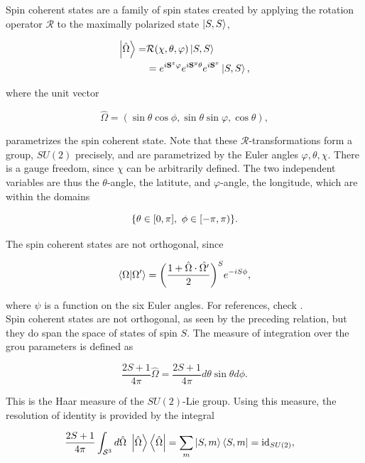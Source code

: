 \documentclass{homework}
\begin{document}
Spin coherent states are a family of spin states created by applying the rotation operator $\mathcal{R}$ to the maximally polarized state $\ket{S,S}$,

\begin{equation}
\begin{split}
    \ket{\hat{\Omega}} =& \mathcal{R}(\chi, \theta, \varphi) \ket{S,S} \\
    &= e^{i{\bf S}^z \varphi} e^{i {\bf S}^y \theta} e^{i {\bf S}^x} \ket{S,S},
\end{split}
\end{equation}

where the unit vector 

\begin{equation}
    \hat{\Omega} = (\sin \theta \cos \phi, \sin \theta \sin \varphi, \cos \theta),
\end{equation}

parametrizes the spin coherent state. Note that these $\mathcal{R}$-transformations form a group, $SU(2)$ precisely, and are parametrized by the Euler angles $\varphi, \theta, \chi$. There is a gauge freedom, since $\chi$ can be arbitrarily defined. The two independent variables are thus the $\theta$-angle, the latitute, and $\varphi$-angle, the longitude, which are within the domains 

$$
    \{\theta \in [0, \pi], \textnormal{ } \phi \in [-\pi, \pi) \}.
$$

The spin coherent states are not orthogonal, since 

$$
    \bra{\Omega} \ket{\Omega'} = \bigg(\frac{1+\hat{\Omega} \cdot \hat{\Omega'}}{2}\bigg)^S e^{-iS\phi},
$$

where $\psi$ is a function on the six Euler angles. For references, check \cite{assa}. \\

Spin coherent states are not orthogonal, as seen by the preceding relation, but they do span the space of states of spin $S$. The measure of integration over the grou parameters is defined as 

\begin{equation}
    \frac{2S+1}{4\pi} \hat{\Omega} = \frac{2S+1}{4\pi} d\theta \sin \theta d\phi.
\end{equation}

This is the Haar measure of the $SU(2)$-Lie group. Using this measure, the resolution of identity is provided by the integral

\begin{equation}
    \begin{split}
        \frac{2S+1}{4\pi} \int_{\mathcal{S}^3} d\hat{\Omega} \blanky \ket{\hat{\Omega}} \bra{\hat{\Omega}} %
        &= \sum_{m} \ket{S,m}\bra{S,m} = \textnormal{id}_{SU(2)},
        \label{spin_coherent_resol_id}
    \end{split}
\end{equation}
\end{document}
